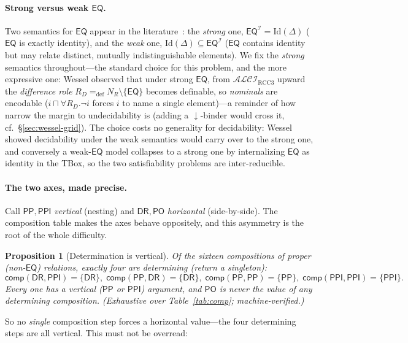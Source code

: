 \documentclass[11pt]{article}
\newcommand{\ALCIRCC}[1]{\mathcal{ALCI}_{\mathrm{RCC#1}}}
\newcommand{\DR}{\mathsf{DR}}
\newcommand{\PO}{\mathsf{PO}}
\newcommand{\PP}{\mathsf{PP}}
\newcommand{\PPI}{\mathsf{PPI}}
\newcommand{\EQ}{\mathsf{EQ}}
\newcommand{\comp}{\ensuremath{\mathsf{comp}}}
\theoremstyle{plain}
\newtheorem{proposition}[theorem]{Proposition}
\theoremstyle{definition}
\begin{document}
\paragraph{Strong versus weak $\EQ$.} Two semantics for $\EQ$ appear in
the literature~\cite{Wessel2003}: the \emph{strong} one, $\EQ^{\mathcal
I}=\mathrm{Id}(\Delta)$ ($\EQ$ is exactly identity), and the \emph{weak}
one, $\mathrm{Id}(\Delta)\subseteq\EQ^{\mathcal I}$ ($\EQ$ contains
identity but may relate distinct, mutually indistinguishable elements). We
fix the \emph{strong} semantics throughout---the standard choice for this
problem, and the more expressive one: Wessel observed that under strong
$\EQ$, from $\ALCIRCC3$ upward the \emph{difference role}
$R_D =_{\mathrm{def}} N_R\setminus\{\EQ\}$ becomes definable, so
\emph{nominals} are encodable ($i\sqcap\forall R_D.\neg i$ forces $i$ to
name a single element)---a reminder of how narrow the margin to
undecidability is (adding a $\downarrow$-binder would cross it, cf.\
\S\ref{sec:wessel-grid}). The choice costs no generality for decidability:
Wessel showed decidability under the weak semantics would carry over to the
strong one, and conversely a weak-$\EQ$ model collapses to a strong one by
internalizing $\EQ$ as identity in the TBox, so the two satisfiability
problems are inter-reducible.

\paragraph{The two axes, made precise.} Call $\PP,\PPI$ \emph{vertical}
(nesting) and $\DR,\PO$ \emph{horizontal} (side-by-side). The composition
table makes the axes behave oppositely, and this asymmetry is the root of
the whole difficulty.

\begin{proposition}[Determination is vertical]\label{prop:vertical}
Of the sixteen compositions of proper (non-$\EQ$) relations, exactly four
are \emph{determining} (return a singleton):
\[
\comp(\DR,\PPI)=\{\DR\},\; \comp(\PP,\DR)=\{\DR\},\;
\comp(\PP,\PP)=\{\PP\},\; \comp(\PPI,\PPI)=\{\PPI\}.
\]
Every one has a vertical ($\PP$ or $\PPI$) argument, and $\PO$ is never
the value of any determining composition. (Exhaustive over
Table~\ref{tab:comp}; machine-verified.)
\end{proposition}

So no \emph{single} composition step forces a horizontal value---the four
determining steps are all vertical. This must not be overread:
\end{document}
